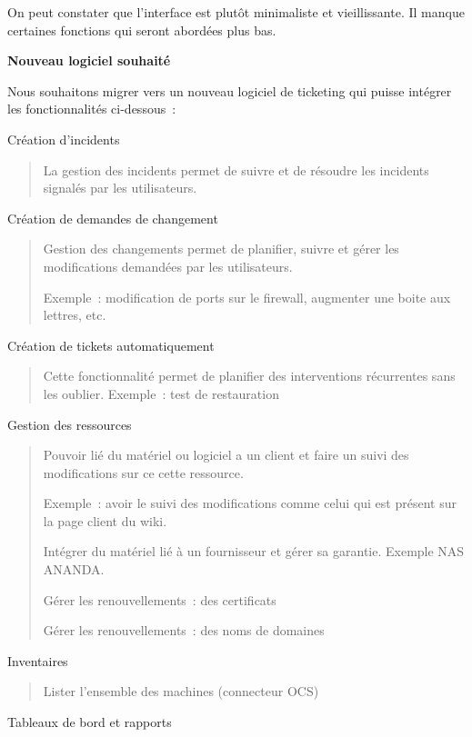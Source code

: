 On peut constater que l'interface est plutôt minimaliste et
vieillissante. Il manque certaines fonctions qui seront abordées plus
bas.

\textbf{Nouveau logiciel souhaité}

Nous souhaitons migrer vers un nouveau logiciel de ticketing qui puisse
intégrer les fonctionnalités ci-dessous~:

Création d'incidents

\begin{quote}
La gestion des incidents permet de suivre et de résoudre les incidents
signalés par les utilisateurs.
\end{quote}

Création de demandes de changement

\begin{quote}
Gestion des changements permet de planifier, suivre et gérer les
modifications demandées par les utilisateurs.

Exemple~: modification de ports sur le firewall, augmenter une boite aux
lettres, etc.
\end{quote}

Création de tickets automatiquement

\begin{quote}
Cette fonctionnalité permet de planifier des interventions récurrentes
sans les oublier. Exemple~: test de restauration
\end{quote}

Gestion des ressources

\begin{quote}
Pouvoir lié du matériel ou logiciel a un client et faire un suivi des
modifications sur ce cette ressource.

Exemple~: avoir le suivi des modifications comme celui qui est présent
sur la page client du wiki.

Intégrer du matériel lié à un fournisseur et gérer sa garantie. Exemple
NAS ANANDA.

Gérer les renouvellements~: des certificats

Gérer les renouvellements~: des noms de domaines
\end{quote}

Inventaires

\begin{quote}
Lister l'ensemble des machines (connecteur OCS)
\end{quote}

Tableaux de bord et rapports

